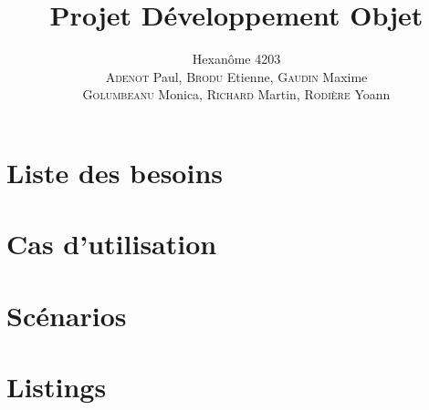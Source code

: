 


\title{\textbf{Projet Développement Objet}}
\author{Hexanôme 4203\\
\textsc{Adenot} Paul, \textsc{Brodu} Etienne, \textsc{Gaudin} Maxime\\
\textsc{Golumbeanu} Monica, \textsc{Richard} Martin, \textsc{Rodière} Yoann}

\graphicspath{{./img/}{../img/}{../../img/}{../../../img/}}


	\maketitle
	\tableofcontents

	\newpage
	\part{Liste des besoins}
	
	

	\newpage
	\part{Cas d'utilisation}
	
	

	\newpage
	\part{Scénarios}
	
	

	\newpage
	\part{Listings}
	

